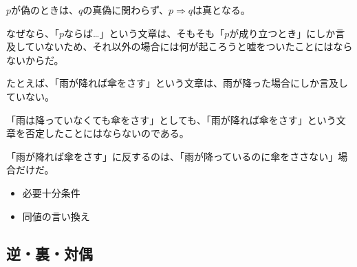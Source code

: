 \documentclass[../../imaging-math]{subfiles}
\begin{document}
$p$が偽のときは、$q$の真偽に関わらず、$p \Rightarrow q$は真となる。

なぜなら、「$p$ならば…」という文章は、そもそも「$p$が成り立つとき」にしか言及していないため、それ以外の場合には何が起ころうと嘘をついたことにはならないからだ。

\br

たとえば、「雨が降れば傘をさす」という文章は、雨が降った場合にしか言及していない。

「雨は降っていなくても傘をさす」としても、「雨が降れば傘をさす」という文章を否定したことにはならないのである。

「雨が降れば傘をさす」に反するのは、「雨が降っているのに傘をささない」場合だけだ。

\begin{mindflow}
  \begin{itemize}
    \item 必要十分条件
    \item 同値の言い換え
  \end{itemize}
\end{mindflow}

\subsection{逆・裏・対偶}
\end{document}
